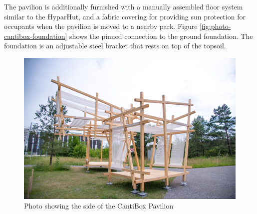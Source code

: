 The pavilion is additionally furnished with a manually assembled floor system similar to the HyparHut, and a fabric covering for providing sun protection for occupants when the pavilion is moved to a nearby park. Figure \ref{fig:photo-cantibox-foundation} shows the pinned connection to the ground foundation. The foundation is an adjustable steel bracket that rests on top of the topsoil.

\begin{figure}[!h]
    \centering
    \begin{minipage}[b]{0.68\textwidth}
        \centering
        \includegraphics[width=\textwidth]{images/08/img25.jpg}
        \caption{Photo showing the side of the CantiBox Pavilion}
        \label{fig:photo-cantibox-side}
    \end{minipage}
    \hfill
    \begin{minipage}[b]{0.3\textwidth}
        \centering

\end{minipage}
\end{figure}
